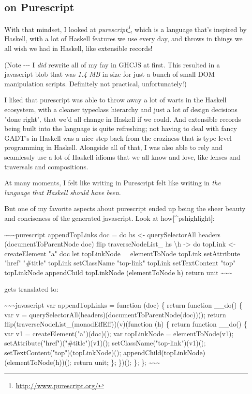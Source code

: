 \documentclass[]{article}
\renewcommand{\href}[2]{#2\footnote{\url{#1}}}
\begin{document}
\subsection{on Purescript}

With that mindset, I looked at
\emph{\href{http://www.purescript.org/}{purescript}}, which is a language that's
inspired by Haskell, with a lot of Haskell features we use every day, and throws
in things we all wish we had in Haskell, like extensible records!

(Note -\/-\/- I \emph{did} rewrite all of my fay in GHCJS at first. This
resulted in a javascript blob that was \emph{1.4 MB} in size for just a bunch of
small DOM manipulation scripts. Definitely not practical, unfortunately!)

I liked that purescript was able to throw away a lot of warts in the Haskell
ecosystem, with a cleaner typeclass hierarchy and just a lot of design decisions
"done right", that we'd all change in Haskell if we could. And extensible
records being built into the language is quite refreshing; not having to deal
with fancy GADT's in Haskell was a nice step back from the craziness that is
type-level programming in Haskell. Alongside all of that, I was also able to
rely and seamlessly use a lot of Haskell idioms that we all know and love, like
lenses and traversals and compositions.

At many moments, I felt like writing in Purescript felt like writing in
\emph{the language that Haskell should have been}.

But one of my favorite aspects about purescript ended up being the sheer beauty
and conciseness of the generated javascript. Look at how{[}\^{}pshighlight{]}:

\textasciitilde{}\textasciitilde{}\textasciitilde{}purescript appendTopLinks doc
= do hs \textless{}- querySelectorAll headers (documentToParentNode doc) flip
traverseNodeList\_ hs \textbackslash{}h -\textgreater{} do topLink \textless{}-
createElement "a" doc let topLinkNode = elementToNode topLink setAttribute
"href" "\#title" topLink setClassName "top-link" topLink setTextContent "top"
topLinkNode appendChild topLinkNode (elementToNode h) return unit
\textasciitilde{}\textasciitilde{}\textasciitilde{}

gets translated to:

\textasciitilde{}\textasciitilde{}\textasciitilde{}javascript var appendTopLinks
= function (doc) \{ return function \_\_do() \{ var v =
querySelectorAll(headers)(documentToParentNode(doc))(); return
flip(traverseNodeList\_(monadEffEff))(v)(function (h) \{ return function
\_\_do() \{ var v1 = createElement("a")(doc)(); var topLinkNode =
elementToNode(v1); setAttribute("href")("\#title")(v1)();
setClassName("top-link")(v1)(); setTextContent("top")(topLinkNode)();
appendChild(topLinkNode)(elementToNode(h))(); return unit; \}; \})(); \}; \};
\textasciitilde{}\textasciitilde{}\textasciitilde{}
\end{document}

